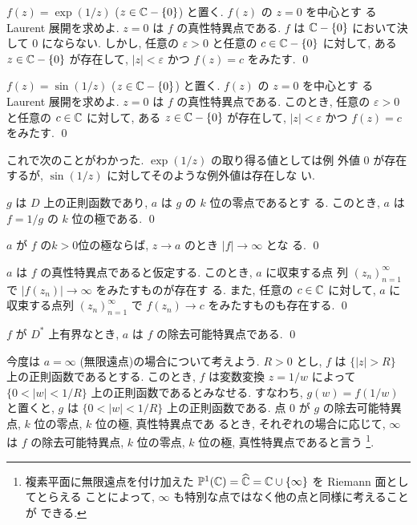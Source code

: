 \documentclass[12pt,twoside]{jarticle}
\begin{document}
\begin{question}
  $f(z)=\exp(1/z)$ ($z\in{\mathbb C}-\{0\}$) と置く. $f(z)$ の $z=0$ を中心とす
  る Laurent 展開を求めよ. $z=0$ は $f$ の真性特異点である. $f$ は 
  ${\mathbb C}-\{0\}$ において決して $0$ にならない. しかし, 任意の %
  $\varepsilon>0$ と任意の $c\in{\mathbb C}-\{0\}$ に対して, ある 
  $z\in{\mathbb C}-\{0\}$ が存在して, $|z|<\varepsilon$ かつ $f(z)=c$ をみたす.
  \qed
\end{question}

\begin{question}
  $f(z)=\sin(1/z)$ ($z\in{\mathbb C}-\{0\}$) と置く. $f(z)$ の $z=0$ を中心とす
  る Laurent 展開を求めよ. $z=0$ は $f$ の真性特異点である. このとき, 
  任意の $\varepsilon>0$ と任意の $c\in{\mathbb C}$ に対して, ある 
  $z\in{\mathbb C}-\{0\}$ が存在して, $|z|<\varepsilon$ かつ $f(z)=c$ をみたす.
  \qed
\end{question}

\noindent これで次のことがわかった. $\exp(1/z)$ の取り得る値としては例
外値 $0$ が存在するが, $\sin(1/z)$ に対してそのような例外値は存在しな
い.

\begin{question}
  $g$ は $D$ 上の正則函数であり, $a$ は $g$ の $k$ 位の零点であるとす
  る. このとき, $a$ は $f=1/g$ の $k$ 位の極である. \qed
\end{question}

\begin{question}
  $a$ が $f$ の$k>0$位の極ならば, $z\to a$ のとき $|f|\to\infty$ とな
  る. \qed
\end{question}

\begin{question}
  $a$ は $f$ の真性特異点であると仮定する.  このとき, $a$ に収束する点
  列 $(z_n)_{n=1}^\infty$ で $|f(z_n)|\to\infty$ をみたすものが存在す
  る. また, 任意の $c\in{\mathbb C}$ に対して, $a$ に収束する点列 
  $(z_n)_{n=1}^\infty$ で $f(z_n)\to c$ をみたすものも存在する.  \qed
\end{question}

\begin{question}
  $f$ が $D^*$ 上有界なとき, $a$ は $f$ の除去可能特異点である. \qed
\end{question}


今度は $a=\infty$ (無限遠点)の場合について考えよう. $R > 0$ とし, $f$ は %
$\{|z|>R\}$ 上の正則函数であるとする. このとき, $f$ は変数変換 $z=1/w$ %
によって $\{0<|w|<1/R\}$ 上の正則函数であるとみなせる. すなわち,
$g(w)=f(1/w)$ と置くと, $g$ は $\{0<|w|<1/R\}$ 上の正則函数である. 点 %
$0$ が $g$ の除去可能特異点, $k$ 位の零点, $k$ 位の極, 真性特異点であ
るとき, それぞれの場合に応じて, $\infty$ は $f$ の除去可能特異点, $k$ %
位の零点, $k$ 位の極, 真性特異点であると言う%
\footnote{複素平面に無限遠点を付け加えた 
  ${\mathbb P}^1({\mathbb C})=\widehat{{\mathbb C}}={\mathbb C}\cup\{\infty\}$ を Riemann 面としてとらえる
  ことによって, $\infty$ も特別な点ではなく他の点と同様に考えることが
  できる.}.
\end{document}
